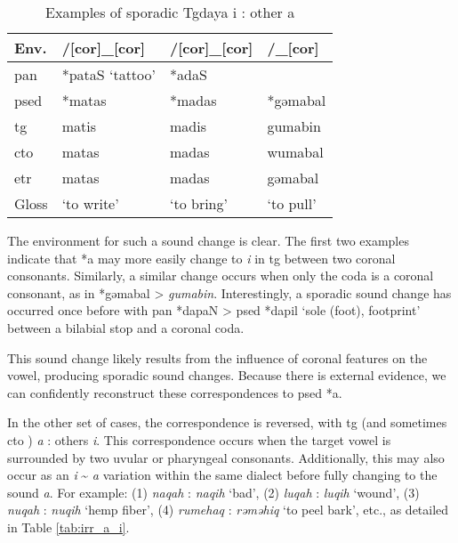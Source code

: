 \begin{table}[!htbp]
\centering
\caption{Examples of sporadic Tgdaya i : other a}
\label{tab:irr_i_a}
\begin{tabular}{llll}
\hline
Env.      & /[cor]\_[cor]   & /[cor]\_[cor] & /\_[cor]  \\ \hline
\ac{pan}  & *pataS `tattoo' & *adaS         &           \\ \hdashline
\ac{psed} & *matas          & *madas        & *gəmabal  \\ \hdashline
\ac{tg}   & matis           & madis         & gumabin   \\
\ac{cto}  & matas           & madas         & wumabal   \\
\ac{etr}  & matas           & madas         & gəmabal   \\ \hline
Gloss     & `to write'      & `to bring'    & `to pull' \\ \hline
\end{tabular}
\end{table}

The environment for such a sound change is clear. The first two examples indicate that *a may more easily change to \textit{i} in \acl{tg} between two coronal consonants. Similarly, a similar change occurs when only the coda is a coronal consonant, as in *gəmabal > \textit{gumabin}. Interestingly, a sporadic sound change has occurred once before with \ac{pan} *dapaN > \ac{psed} *dapil `sole (foot), footprint' between a bilabial stop and a coronal coda.

This sound change likely results from the influence of coronal features on the vowel, producing sporadic sound changes. Because there is external evidence, we can confidently reconstruct these correspondences to \acl{psed} *a.

In the other set of cases, the correspondence is reversed, with \acl{tg} (and sometimes \acl{cto} ) \textit{a} : others \textit{i}. This correspondence occurs when the target vowel is surrounded by two uvular or pharyngeal consonants. Additionally, this may also occur as an \textit{i} \~{} \textit{a} variation within the same dialect before fully changing to the sound \textit{a}. For example: (1) \textit{naqah} : \textit{naqih} `bad', (2) \textit{luqah} : \textit{luqih} `wound', (3) \textit{nuqah} : \textit{nuqih} `hemp fiber', (4) \textit{rumehaq} : \textit{rəməhiq} `to peel bark', etc., as detailed in Table \ref{tab:irr_a_i}.

